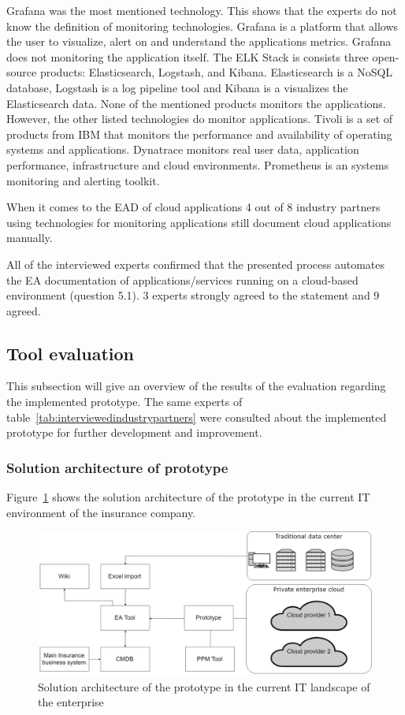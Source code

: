 Grafana was the most mentioned technology. This shows that the experts do not know the definition of monitoring technologies. 
Grafana is a platform that allows the user to visualize, alert on and understand the applications metrics. Grafana does not monitoring the application itself.
The ELK Stack is consists three open-source products: Elasticsearch, Logstash, and Kibana. Elasticsearch is a NoSQL database, Logstash is a log pipeline tool and Kibana is a visualizes the Elasticsearch data. None of the mentioned products monitors the applications.
However, the other listed technologies do monitor applications.
Tivoli is a set of products from IBM that monitors the performance and availability of operating systems and applications.
Dynatrace monitors real user data, application performance, infrastructure and cloud environments.
Prometheus is an systems monitoring and alerting toolkit.

When it comes to the EAD of cloud applications 4 out of 8 industry partners using technologies for monitoring applications still document cloud applications manually.

All of the interviewed experts confirmed that the presented process automates the EA documentation of applications/services running on a cloud-based environment (question 5.1). 3 experts strongly agreed to the statement and 9 agreed.


\subsection{Tool evaluation}

This subsection will give an overview of the results of the evaluation regarding the implemented prototype. The same experts of table~\ref{tab:interviewedindustrypartners} were consulted about the implemented prototype for further development and improvement.

\subsubsection{Solution architecture of prototype}
Figure~\ref{fig:solution-architecture-prototype} shows the solution architecture of the prototype in the current IT environment of the insurance company.

\begin{figure}[htpb]
  \centering
  \includegraphics[width=1.0\textwidth]{figures/solution_architecture-prototype.png}
  \caption{Solution architecture of the prototype in the current IT landscape of the enterprise}
  \label{fig:solution-architecture-prototype}
\end{figure}

